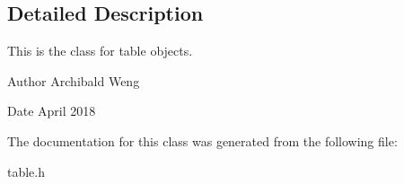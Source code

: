 \subsection{Detailed Description}
This is the class for table objects. 

\begin{DoxyAuthor}{Author}
Archibald Weng 
\end{DoxyAuthor}
\begin{DoxyDate}{Date}
April 2018 
\end{DoxyDate}


The documentation for this class was generated from the following file\+:\begin{DoxyCompactItemize}
\item 
table.\+h\end{DoxyCompactItemize}
